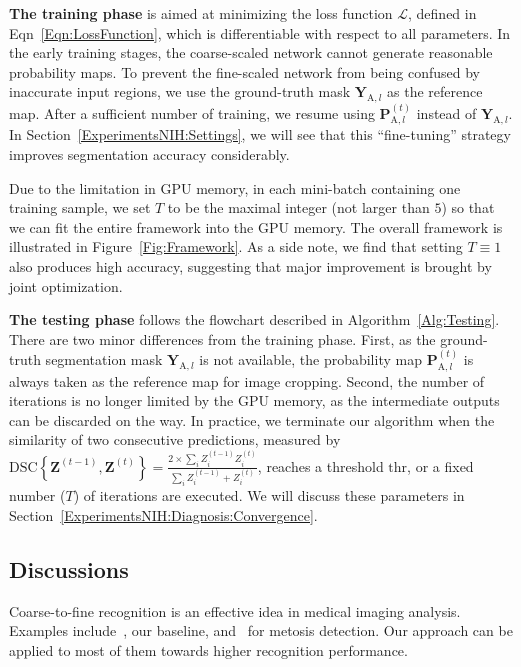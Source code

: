 \documentclass[10pt,twocolumn,letterpaper]{article}
\begin{document}
{\bf The training phase} is aimed at minimizing the loss function $\mathcal{L}$,
defined in Eqn~\eqref{Eqn:LossFunction}, which is differentiable with respect to all parameters.
In the early training stages, the coarse-scaled network cannot generate reasonable probability maps.
To prevent the fine-scaled network from being confused by inaccurate input regions,
we use the ground-truth mask $\mathbf{Y}_{\mathrm{A},l}$ as the reference map.
After a sufficient number of training,
we resume using $\mathbf{P}_{\mathrm{A},l}^{\left(t\right)}$ instead of $\mathbf{Y}_{\mathrm{A},l}$.
In Section~\ref{ExperimentsNIH:Settings}, we will see that this ``fine-tuning'' strategy improves segmentation accuracy considerably.

Due to the limitation in GPU memory, in each mini-batch containing one training sample,
we set $T$ to be the maximal integer (not larger than $5$) so that we can fit the entire framework into the GPU memory.
The overall framework is illustrated in Figure~\ref{Fig:Framework}.
As a side note, we find that setting ${T}\equiv{1}$ also produces high accuracy,
suggesting that major improvement is brought by joint optimization.

{\bf The testing phase} follows the flowchart described in Algorithm~\ref{Alg:Testing}.
There are two minor differences from the training phase.
First, as the ground-truth segmentation mask $\mathbf{Y}_{\mathrm{A},l}$ is not available,
the probability map $\mathbf{P}_{\mathrm{A},l}^{\left(t\right)}$ is always taken as the reference map for image cropping.
Second, the number of iterations is no longer limited by the GPU memory,
as the intermediate outputs can be discarded on the way.
In practice, we terminate our algorithm when the similarity of two consecutive predictions,
measured by ${\mathrm{DSC}\!\left\{\mathbf{Z}^{\left(t-1\right)},\mathbf{Z}^{\left(t\right)}\right\}}=
    {\frac{2\times{\sum_i}Z_i^{\left(t-1\right)}Z_i^{\left(t\right)}}
    {{\sum_i}Z_i^{\left(t-1\right)}+Z_i^{\left(t\right)}}}$,
reaches a threshold $\mathrm{thr}$, or a fixed number ($T$) of iterations are executed.
We will discuss these parameters in Section~\ref{ExperimentsNIH:Diagnosis:Convergence}.


\subsection{Discussions}
\label{Approach:Discussions}

Coarse-to-fine recognition is an effective idea in medical imaging analysis.
Examples include~\cite{Zhou_2017_Fixed}, our baseline, and~\cite{Chen_2016_Mitosis} for metosis detection.
Our approach can be applied to most of them towards higher recognition performance.
\end{document}
